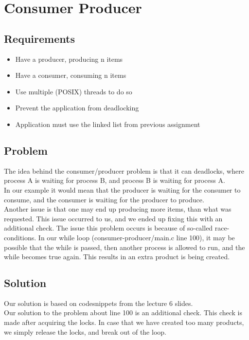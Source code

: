 \chapter{Consumer Producer}

\section{Requirements}

\begin{itemize}
\item Have a producer, producing n items
\item Have a consumer, consuming n items
\item Use multiple (POSIX) threads to do so
\item Prevent the application from deadlocking
\item Application must use the linked list from previous assignment
\end{itemize}

\section{Problem}

The idea behind the consumer/producer problem is that it can deadlocks, where process A is waiting for process B, and process B is waiting for process A.\\

In our example it would mean that the producer is waiting for the consumer to consume, and the consumer is waiting for the producer to produce.\\

Another issue is that one may end up producing more items, than what was requested. This issue occurred to us, and we ended up fixing this with an additional check.
The issue this problem occurs is because of so-called race-conditions.
In our while loop (consumer-producer/main.c line 100), it may be possible that the while is passed, then another process is allowed to run, and the while becomes true again. This results in an extra product is being created.

\section{Solution}
Our solution is based on codesnippets from the lecture 6 slides.\\

Our solution to the problem about line 100 is an additional check. This check is made after acquiring the locks.
In case that we have created too many products, we simply release the locks, and break out of the loop. \\

